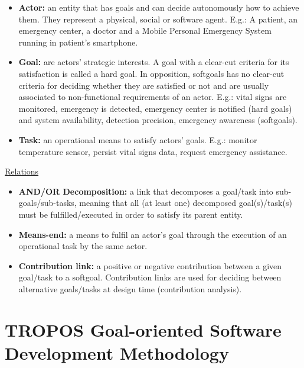 \begin{itemize}

\item \textbf{Actor:} an entity that has goals and can decide autonomously how to achieve them. They represent a physical, social or software agent. E.g.: A patient, an emergency center, a doctor and a Mobile Personal Emergency System running in patient's smartphone.
\medskip

\item \textbf{Goal:} are actors' strategic interests. A goal with a clear-cut criteria for its satisfaction is called a hard goal. In opposition, softgoals has no clear-cut criteria for deciding whether they are satisfied or not and are usually associated to non-functional requirements of an actor. E.g.: vital signs are monitored, emergency is detected, emergency center is notified (hard goals) and system availability, detection precision, emergency awareness (softgoals).
\medskip

\item \textbf{Task:} an operational means to satisfy actors' goals. E.g.: monitor temperature sensor, persist vital signs data, request emergency assistance.

\end{itemize}
\medskip

\large{\underline{Relations}}

\begin{itemize}

\item \textbf{AND/OR Decomposition:} a link that decomposes a goal/task into sub-goals/sub-tasks, meaning that all (at least one) decomposed goal(s)/task(s) must be fulfilled/executed in order to satisfy its parent entity. 
\medskip

\item \textbf{Means-end:} a means to fulfil an actor's goal through the execution of an operational task by the same actor.
\medskip

\item \textbf{Contribution link:} a positive or negative contribution between a given goal/task to a softgoal. Contribution links are used for deciding between alternative goals/tasks at design time (contribution analysis).

\end{itemize}

\section{TROPOS Goal-oriented Software Development Methodology}

